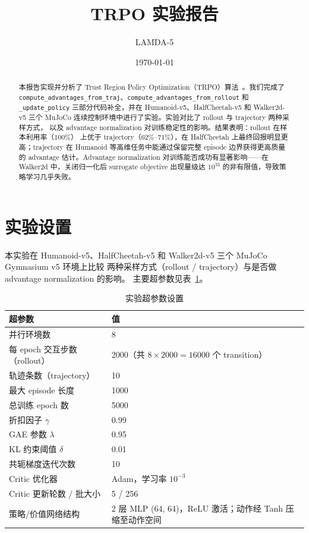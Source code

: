 \documentclass[12pt]{article}
\title{\textbf{\LARGE TRPO 实验报告}}
\author{\large LAMDA-5}
\date{\today}
\begin{document}
\maketitle
\thispagestyle{empty}
\vspace{0.5em}

\begin{abstract}
本报告实现并分析了 Trust Region Policy Optimization（TRPO）算法~\cite{trpo}。我们完成了
\texttt{compute\_advantages\_from\_traj}、\texttt{compute\_advantages\_from\_rollout} 和
\texttt{\_update\_policy} 三部分代码补全，并在 Humanoid-v5、HalfCheetah-v5 和 Walker2d-v5
三个 MuJoCo 连续控制环境中进行了实验。实验对比了 rollout 与 trajectory 两种采样方式，
以及 advantage normalization 对训练稳定性的影响。结果表明：rollout 在样本利用率（$100\%$）
上优于 trajectory（$62\%$--$71\%$），在 HalfCheetah 上最终回报明显更高；trajectory 在 Humanoid
等高维任务中能通过保留完整 episode 边界获得更高质量的 advantage 估计。Advantage normalization
对训练能否成功有显著影响——在 Walker2d 中，关闭归一化后 surrogate objective 出现量级达
$10^{33}$ 的非有限值，导致策略学习几乎失败。
\end{abstract}

\newpage

\section{实验设置}

本实验在 Humanoid-v5、HalfCheetah-v5 和 Walker2d-v5 三个 MuJoCo Gymnasium v5 环境上比较
两种采样方式（rollout / trajectory）与是否做 advantage normalization 的影响。
主要超参数见表~\ref{tab:hyperparams}。

\begin{table}[H]
\centering
\caption{实验超参数设置}
\label{tab:hyperparams}
\begin{tabular}{ll}
\toprule
超参数 & 值 \\
\midrule
并行环境数 & 8 \\
每 epoch 交互步数（rollout） & 2000（共 $8\times2000=16000$ 个 transition）\\
轨迹条数（trajectory） & 10 \\
最大 episode 长度 & 1000 \\
总训练 epoch 数 & 5000 \\
折扣因子 $\gamma$ & 0.99 \\
GAE 参数 $\lambda$ & 0.95 \\
KL 约束阈值 $\delta$ & 0.01 \\
共轭梯度迭代次数 & 10 \\
Critic 优化器 & Adam，学习率 $10^{-3}$ \\
Critic 更新轮数 / 批大小 & 5 / 256 \\
策略/价值网络结构 & 2 层 MLP (64, 64)，ReLU 激活；动作经 Tanh 压缩至动作空间 \\
\bottomrule
\end{tabular}
\end{table}
\end{document}
